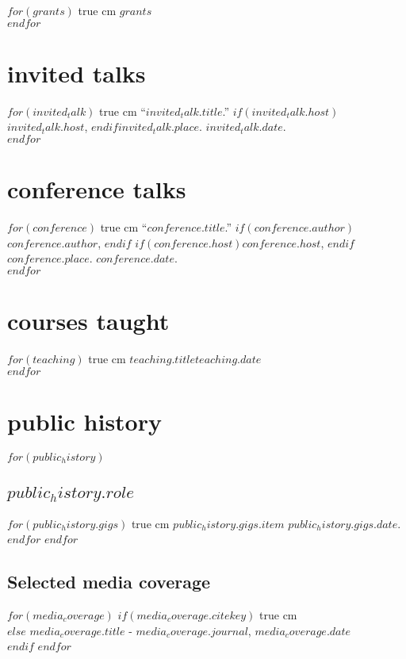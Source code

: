 \documentclass[11pt, letter]{article}
\def\ind{\hangindent=1 true cm\hangafter=1 \noindent}
\begin{document}
$for(grants)$
\ind $grants$\\[.15cm]
$endfor$

\section{invited talks}

$for(invited_talk)$
\ind ``$invited_talk.title$.'' $if(invited_talk.host)$$invited_talk.host$, $endif$$invited_talk.place$. $invited_talk.date$.\\[.15cm]
$endfor$


\section{conference talks}

$for(conference)$
\ind ``$conference.title$.''
$if(conference.author)$$conference.author$, $endif$
$if(conference.host)$$conference.host$, $endif$
$conference.place$.
$conference.date$.\\[.15cm]
$endfor$

\section{courses taught}

$for(teaching)$
\ind $teaching.title$\hspace*{\fill}$teaching.date$\\[.15cm]
$endfor$


\section{public history}

$for(public_history)$
\subsection{$public_history.role$}
$for(public_history.gigs)$
\ind $public_history.gigs.item$ $public_history.gigs.date$.\\[.15cm]
$endfor$
$endfor$
\subsection{Selected media coverage}

$for(media_coverage)$
$if(media_coverage.citekey)$
\ind {}\\
$else$
$media_coverage.title$ -  \textit{$media_coverage.journal$}, $media_coverage.date$\\[.15cm]
$endif$
$endfor$
\end{document}
